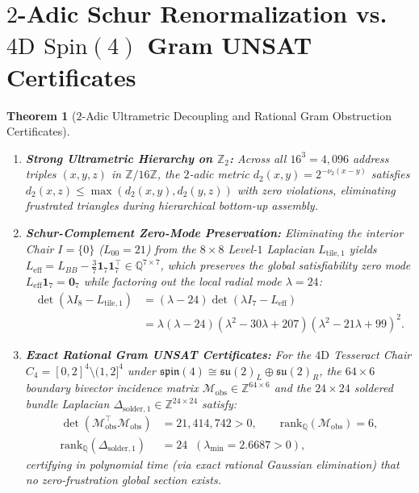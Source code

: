 \documentclass[11pt,a4paper]{article}
\newtheorem{theorem}{Theorem}[section]
\theoremstyle{definition}
\begin{document}
\section{$2$-Adic Schur Renormalization vs.\ $4\mathrm{D}$ $\mathrm{Spin}(4)$ Gram UNSAT Certificates}

\begin{theorem}[$2$-Adic Ultrametric Decoupling and Rational Gram Obstruction Certificates]
\label{thm:renorm_unsat}
\leavevmode
\begin{enumerate}
    \item \textbf{Strong Ultrametric Hierarchy on $\mathbb{Z}_2$:} Across all $16^3 = 4{,}096$ address triples $(x,y,z)$ in $\mathbb{Z}/16\mathbb{Z}$, the $2$-adic metric $d_2(x,y) = 2^{-\nu_2(x-y)}$ satisfies $d_2(x,z) \le \max(d_2(x,y), d_2(y,z))$ with zero violations, eliminating frustrated triangles during hierarchical bottom-up assembly.
    \item \textbf{Schur-Complement Zero-Mode Preservation:} Eliminating the interior Chair $I=\{0\}$ ($L_{00}=21$) from the $8\times 8$ Level-$1$ Laplacian $L_{\mathrm{tile},1}$ yields $L_{\mathrm{eff}} = L_{BB} - \frac{3}{7}\mathbf{1}_7\mathbf{1}_7^\top \in \mathbb{Q}^{7\times 7}$, which preserves the global satisfiability zero mode $L_{\mathrm{eff}}\mathbf{1}_7 = \mathbf{0}_7$ while factoring out the local radial mode $\lambda = 24$:
    \begin{equation}
    \begin{aligned}
    \det(\lambda I_8 - L_{\mathrm{tile},1}) &= (\lambda - 24)\det(\lambda I_7 - L_{\mathrm{eff}}) \\
    &= \lambda(\lambda - 24)(\lambda^2 - 30\lambda + 207)(\lambda^2 - 21\lambda + 99)^2.
    \end{aligned}
    \end{equation}
    \item \textbf{Exact Rational Gram UNSAT Certificates:} For the $4\mathrm{D}$ Tesseract Chair $C_4 = [0,2]^4\setminus(1,2]^4$ under $\mathfrak{spin}(4) \cong \mathfrak{su}(2)_L \oplus \mathfrak{su}(2)_R$, the $64\times 6$ boundary bivector incidence matrix $\mathcal{M}_{\mathrm{obs}} \in \mathbb{Z}^{64\times 6}$ and the $24\times 24$ soldered bundle Laplacian $\Delta_{\mathrm{solder},1} \in \mathbb{Z}^{24\times 24}$ satisfy:
    \begin{equation}
    \begin{aligned}
    \det(\mathcal{M}_{\mathrm{obs}}^\top \mathcal{M}_{\mathrm{obs}}) &= 21{,}414{,}742 > 0, \qquad \mathrm{rank}_{\mathbb{Q}}(\mathcal{M}_{\mathrm{obs}}) = 6, \\
    \mathrm{rank}_{\mathbb{Q}}(\Delta_{\mathrm{solder},1}) &= 24 \;\; (\lambda_{\min} = 2.6687 > 0),
    \end{aligned}
    \end{equation}
    certifying in polynomial time (via exact rational Gaussian elimination) that no zero-frustration global section exists.
\end{enumerate}
\end{theorem}
\end{document}
